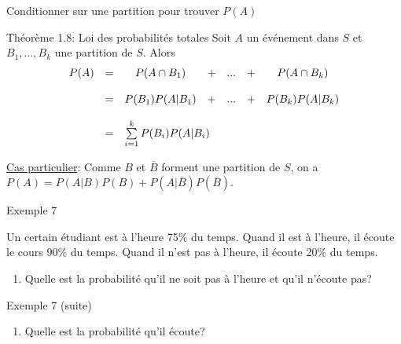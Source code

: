 \documentclass{BeamerTemplate}
\begin{document}
\begin{frame}[t]{Conditionner sur une partition pour trouver $P(A)$}
 \begin{Boite}{Théorème 1.8: Loi des probabilités totales}
  Soit $A$ un événement dans $S$ et $B_1,\ldots,B_k$ une partition
  de $S$. Alors
  $$\begin{array}{llccccc}
P(A)&=& P(A\cap B_1) &+&...&+&P(A\cap B_k)\\
&&&&&&\\
    &=&P(B_1)P(A|B_1)&+&...&+&P(B_k)P(A|B_k)\\
&&&&&&\\
    &=&\multicolumn{5}{l}{\sum\limits_{i=1}^k P(B_i)P(A|B_i)}\\
\end{array}
$$
 \end{Boite}


 \bigskip
 \underline{Cas particulier}: Comme $B$ et $\overline{B}$ forment une partition
 de $S$, on a $P(A)=P(A|B)P(B)+P(A|\overline{B})P(\overline{B})$.
\end{frame}
\begin{frame}[t]{Exemple 7}

{\small Un certain étudiant est à l'heure 75\% du temps. Quand il est à l'heure, il écoute le cours 90\% du temps. Quand il n'est pas à l'heure, il écoute 20\%
 du temps.

\begin{enumerate}\itemsep 2cm
\item[a)] Quelle est la probabilité qu'il ne soit pas à l'heure et qu'il n'écoute pas?
\end{enumerate}



}
\end{frame}
\begin{frame}[t]{Exemple 7 (suite)}

{\small
\begin{enumerate}\itemsep 2cm
\item[b)]  Quelle est la probabilité qu'il écoute?
\end{enumerate}


 \vspace{5 cm}
}
\end{frame}
\end{document}
